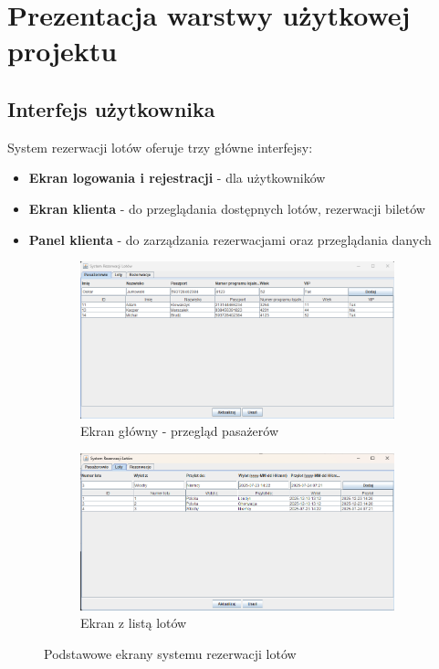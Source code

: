 \section{Prezentacja warstwy użytkowej projektu}
\subsection{Interfejs użytkownika}
System rezerwacji lotów oferuje trzy główne interfejsy:
\begin{itemize}
\item \textbf{Ekran logowania i rejestracji} - dla użytkowników
\item \textbf{Ekran klienta} - do przeglądania dostępnych lotów, rezerwacji biletów
\item \textbf{Panel klienta} - do zarządzania rezerwacjami oraz przeglądania danych
\end{itemize}

\begin{figure}[H]
\centering
\begin{subfigure}{0.45\textwidth}
\includegraphics[width=\textwidth]{figures/1.png}
\caption{Ekran główny - przegląd pasażerów}
\label{fig:main_screen}
\end{subfigure}
\begin{subfigure}{0.45\textwidth}
\includegraphics[width=\textwidth]{figures/2.png}
\caption{Ekran z listą lotów}
\label{fig:flights_screen}
\end{subfigure}
\caption{Podstawowe ekrany systemu rezerwacji lotów}
\end{figure}

